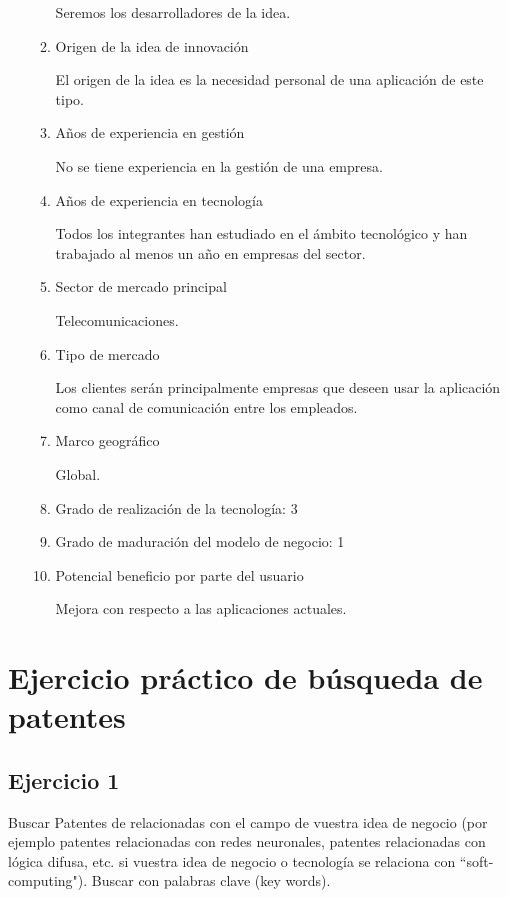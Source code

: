 \documentclass[11pt,leqno]{article}
\begin{document}
\begin{enumerate}
\begin{enumerate}[a]
	Seremos los desarrolladores de la idea.
\item Origen de la idea de innovación 

	El origen de la idea es la necesidad personal de una aplicación de este
	tipo.
	
\item  Años de experiencia en gestión

	No se tiene experiencia en la gestión de una empresa.
\item Años de experiencia en tecnología

	Todos los integrantes han estudiado en el ámbito tecnológico
	y han trabajado al menos un año en empresas del sector.
\item Sector de mercado principal 
	
	Telecomunicaciones.
\item Tipo de mercado 
	
	Los clientes serán principalmente empresas que deseen usar la aplicación
	como canal de comunicación entre los empleados.
\item Marco geográfico 

	Global.
\item  Grado de realización de la tecnología: 3
\item Grado de maduración del modelo de negocio: 1

\item Potencial beneficio por parte del usuario 

	Mejora con respecto a las aplicaciones actuales.
\end{enumerate}


\end{enumerate}

	
	
\section{Ejercicio práctico de búsqueda de patentes}

\subsection{Ejercicio 1}
Buscar Patentes de relacionadas con el campo de vuestra idea de negocio 
(por ejemplo patentes relacionadas con redes neuronales, patentes relacionadas 
con lógica difusa, etc. si vuestra idea de negocio o tecnología se relaciona con ``soft-computing"). 
Buscar con palabras clave (key words).
\end{document}
